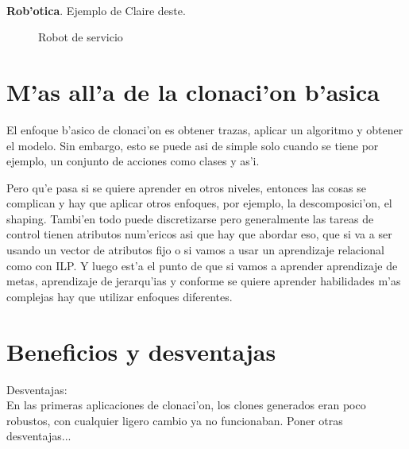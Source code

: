 \documentclass[11pt]{article}
\begin{document}
\paragraph{}
\noindent
\textbf{Rob'otica}. Ejemplo de Claire deste.

\begin{figure}[h]
\begin{center}

\caption{Robot de servicio}
  \label{fig:robotservicio}
\end{center}
\end{figure} 




\section{M'as all'a de la clonaci'on b'asica}
El enfoque b'asico de clonaci'on es obtener trazas, aplicar un algoritmo y obtener el modelo. Sin embargo, esto se puede asi de simple solo cuando se tiene por ejemplo, un conjunto de acciones como clases y as'i. 

Pero qu'e pasa si se quiere aprender en otros niveles, entonces las cosas se complican y hay que aplicar otros enfoques, por ejemplo, la descomposici'on, el shaping. Tambi'en todo puede discretizarse pero generalmente las tareas de control tienen atributos num'ericos asi que hay que abordar eso, que si va a ser usando un vector de atributos fijo o si vamos a usar un aprendizaje relacional como con ILP. Y luego est'a el punto de que si vamos a aprender aprendizaje de metas, aprendizaje de jerarqu'ias y conforme se quiere aprender habilidades m'as complejas hay que utilizar enfoques diferentes.

\section{Beneficios y desventajas}

Desventajas:\\
En las primeras aplicaciones de clonaci'on, los clones generados eran poco robustos, con cualquier ligero cambio ya no funcionaban. Poner otras desventajas...
\end{document}
